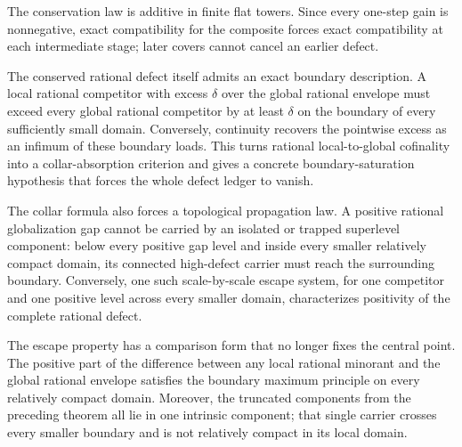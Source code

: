 


The conservation law is additive in finite flat towers.  Since every
one-step gain is nonnegative, exact compatibility for the composite forces
exact compatibility at each intermediate stage; later covers cannot cancel
an earlier defect.

\medskip



The conserved rational defect itself admits an exact boundary description.
A local rational competitor with excess $\delta$ over the global rational
envelope must exceed every global rational competitor by at least $\delta$
on the boundary of every sufficiently small domain.  Conversely, continuity
recovers the pointwise excess as an infimum of these boundary loads.  This
turns rational local-to-global cofinality into a collar-absorption criterion
and gives a concrete boundary-saturation hypothesis that forces the whole
defect ledger to vanish.

\medskip



The collar formula also forces a topological propagation law.  A positive
rational globalization gap cannot be carried by an isolated or trapped
superlevel component: below every positive gap level and inside every
smaller relatively compact domain, its connected high-defect carrier must
reach the surrounding boundary.  Conversely, one such scale-by-scale escape
system, for one competitor and one positive level across every smaller
domain, characterizes positivity of the complete rational defect.

\medskip



The escape property has a comparison form that no longer fixes the central
point.  The positive part of the difference between any local rational
minorant and the global rational envelope satisfies the boundary maximum
principle on every relatively compact domain.  Moreover, the truncated
components from the preceding theorem all lie in one intrinsic component;
that single carrier crosses every smaller boundary and is not relatively
compact in its local domain.

